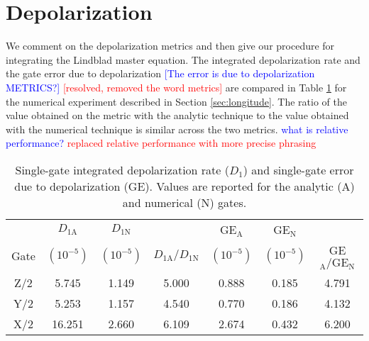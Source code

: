 \section{Depolarization \label{appendix:longitude}}
We comment on the depolarization metrics and then give
our procedure for integrating the Lindblad master equation.
The integrated depolarization rate and the gate error due to
depolarization
\textcolor{blue}{[The error is due to depolarization METRICS?]}
\textcolor{red}{[resolved, removed the word metrics]}
are compared in Table \ref{tab:longitude} for the
numerical experiment described in Section \ref{sec:longitude}.
The ratio of the value obtained on the metric with the analytic technique
to the value obtained with the numerical technique
is similar across the two metrics.
\textcolor{blue}{what is relative performance?}
\textcolor{red}{replaced relative performance with more precise phrasing}

\begin{table}[ht]
  \begin{tabular}{c | c | c | c | c | c | c}
         & $D_{1\textrm{A}}$ & $D_{1\textrm{N}}$ & & GE$_{\textrm{A}}$ & GE$_{\textrm{N}}$ &\\
    Gate & $(10^{-5})$ & $(10^{-5})$ & $D_{1\textrm{A}}/ D_{1\textrm{N}}$ & $(10^{-5})$ &
    $(10^{-5})$ & GE$_{\textrm{A}} / \textrm{GE}_{\textrm{N}}$\\
    \hline
    Z/2 & 5.745 & 1.149 & 5.000 & 0.888   & 0.185  & 4.791 \\
    Y/2 & 5.253 & 1.157 & 4.540 & 0.770 & 0.186   & 4.132\\
    X/2 & 16.251 & 2.660 & 6.109 & 2.674 & 0.432  & 6.200\\
  \end{tabular}
  \caption{
    Single-gate integrated depolarization rate ($D_{1}$)
    and single-gate error due to depolarization (GE).
    Values are reported for the analytic (A) and numerical (N) gates.
  }
  \label{tab:longitude}
\end{table}

